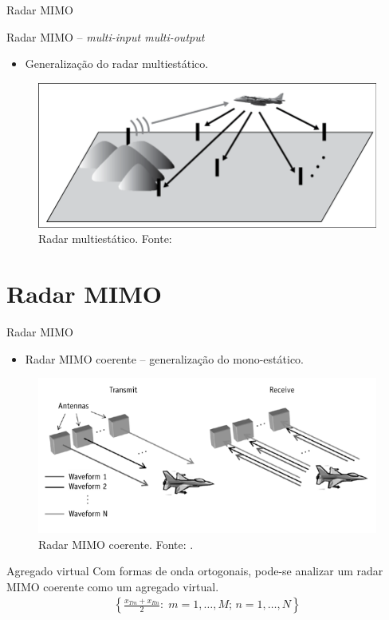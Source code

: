 \documentclass[portuguese]{beamer}
\begin{document}
\begin{frame}{Radar MIMO}
  \par
  {\large Radar MIMO -- \textit{multi-input multi-output}} 
  \begin{itemize}
	\item Generalização do radar multiestático.
  \end{itemize}
  \begin{figure}[]
	\centering
	\includegraphics[width=0.8\linewidth]{../report/graphics/multistatic.png}
	\caption{Radar multiestático. Fonte: \cite{mimoradarbook}}
	\label{fig:mono}
  \end{figure}
\end{frame}

\section{Radar MIMO}

\begin{frame}{Radar MIMO}
  \begin{itemize}
	\item Radar MIMO coerente -- generalização do mono-estático.
  \end{itemize}
  \begin{figure}[]
	\centering
	\includegraphics[width=0.7\linewidth]{../report/graphics/concept.png}
	\caption{Radar MIMO coerente. Fonte: \cite{mimoradarbook}.}
	\label{fig:concept}
  \end{figure}
\end{frame}

\begin{frame}{Agregado virtual}
  Com formas de onda ortogonais, pode-se analizar um radar MIMO coerente como um agregado virtual.
  \begin{align*}
    \left\{ \frac{x_{Tm}+x_{Rn}}{2}:\; m=1,\ldots,M;\,n=1,\ldots,N \right\}
  \end{align*}
\end{frame}
\end{document}
